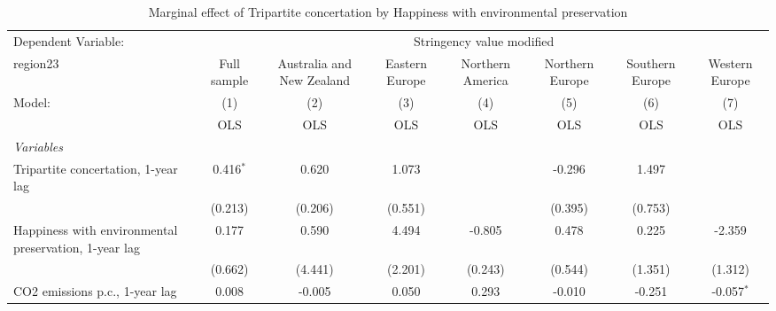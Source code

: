 
\begin{table}[htbp]
   \caption{Marginal effect of Tripartite concertation by Happiness with environmental preservation}
   \centering
   \begin{tabular}{lccccccc}
      \toprule
      Dependent Variable: & \multicolumn{7}{c}{Stringency value modified}\\
      region23                                                                                    & Full sample   & Australia and New Zealand & Eastern Europe & Northern America & Northern Europe & Southern Europe & Western Europe \\   
      Model:                                                                                      & (1)           & (2)                       & (3)            & (4)              & (5)             & (6)             & (7)\\  
                                                                                                  &  OLS          & OLS                       & OLS            & OLS              & OLS             & OLS             & OLS\\  
      \midrule
      \emph{Variables}\\
      Tripartite concertation, 1-year lag                                                         & 0.416$^{*}$   & 0.620                     & 1.073          &                  & -0.296          & 1.497           &   \\   
                                                                                                  & (0.213)       & (0.206)                   & (0.551)        &                  & (0.395)         & (0.753)         &   \\   
      Happiness with environmental preservation, 1-year lag                                       & 0.177         & 0.590                     & 4.494          & -0.805           & 0.478           & 0.225           & -2.359\\   
                                                                                                  & (0.662)       & (4.441)                   & (2.201)        & (0.243)          & (0.544)         & (1.351)         & (1.312)\\   
      CO2 emissions p.c., 1-year lag                                                              & 0.008         & -0.005                    & 0.050          & 0.293            & -0.010          & -0.251          & -0.057$^{*}$\\   

\end{tabular}
\end{table}
